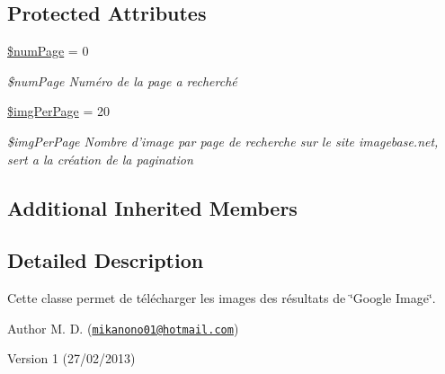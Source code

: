 \subsection*{Protected Attributes}
\begin{DoxyCompactItemize}
\item 
\hypertarget{class_google_image_downloader_ad9721caaec06f589accb445e1679fb2b}{\hyperlink{class_google_image_downloader_ad9721caaec06f589accb445e1679fb2b}{\$num\-Page} = 0}\label{class_google_image_downloader_ad9721caaec06f589accb445e1679fb2b}

\begin{DoxyCompactList}\small\item\em \$num\-Page Numéro de la page a recherché \end{DoxyCompactList}\item 
\hypertarget{class_google_image_downloader_a8af857b050cdfa3d831eb246f8983cb5}{\hyperlink{class_google_image_downloader_a8af857b050cdfa3d831eb246f8983cb5}{\$img\-Per\-Page} = 20}\label{class_google_image_downloader_a8af857b050cdfa3d831eb246f8983cb5}

\begin{DoxyCompactList}\small\item\em \$img\-Per\-Page Nombre d'image par page de recherche sur le site imagebase.\-net, sert a la création de la pagination \end{DoxyCompactList}\end{DoxyCompactItemize}
\subsection*{Additional Inherited Members}


\subsection{Detailed Description}
Cette classe permet de télécharger les images des résultats de \char`\"{}\-Google Image\char`\"{}. 

\begin{DoxyAuthor}{Author}
M. D. (\href{mailto:mikanono01@hotmail.com}{\tt mikanono01@hotmail.\-com}) 
\end{DoxyAuthor}
\begin{DoxyVersion}{Version}
1 (27/02/2013) 
\end{DoxyVersion}



